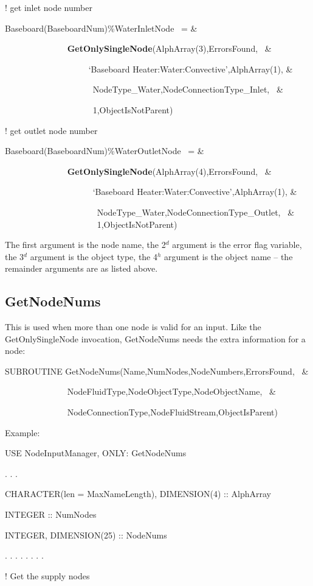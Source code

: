 ! get inlet node number

Baseboard(BaseboardNum)\%WaterInletNode~ = \&

~~~~~~~~~~~~~~ \textbf{GetOnlySingleNode}(AlphArray(3),ErrorsFound,~ \&

~~~~~~~~~~~~~~~~~~~ `Baseboard Heater:Water:Convective',AlphArray(1), \&

~~~~~ ~~~~~~~~~~~~~~~NodeType\_Water,NodeConnectionType\_Inlet,~ \&

~~~~~~~~~~~~~~~~~~~~ 1,ObjectIsNotParent)

! get outlet node number

Baseboard(BaseboardNum)\%WaterOutletNode~ = \&

~~~~~~~~~~~~~~ \textbf{GetOnlySingleNode}(AlphArray(4),ErrorsFound,~ \&

~~~~~~~~~~~~~~~~~~~~ `Baseboard Heater:Water:Convective',AlphArray(1), \&

~~~~~~~~~~~~~~~~~~~~~ NodeType\_Water,NodeConnectionType\_Outlet,~ \& ~~~~~~~~~~~~~~~~~~~~~ 1,ObjectIsNotParent)

The first argument is the node name, the 2\(^{d}\) argument is the error flag variable, the 3\(^{d}\) argument is the object type, the 4\(^{h}\) argument is the object name -- the remainder arguments are as listed above.

\subsection{GetNodeNums}\label{getnodenums}

This is used when more than one node is valid for an input. Like the GetOnlySingleNode invocation, GetNodeNums needs the extra information for a node:

SUBROUTINE GetNodeNums(Name,NumNodes,NodeNumbers,ErrorsFound,~ \&

~~~~~~~~~~~~~~ NodeFluidType,NodeObjectType,NodeObjectName,~ \&

~~~~~~~~~~~~~~ NodeConnectionType,NodeFluidStream,ObjectIsParent)

Example:

USE NodeInputManager, ONLY: GetNodeNums

. . .

CHARACTER(len = MaxNameLength), DIMENSION(4) :: AlphArray

INTEGER :: NumNodes

INTEGER, DIMENSION(25) :: NodeNums

. . . . . . . .

! Get the supply nodes

